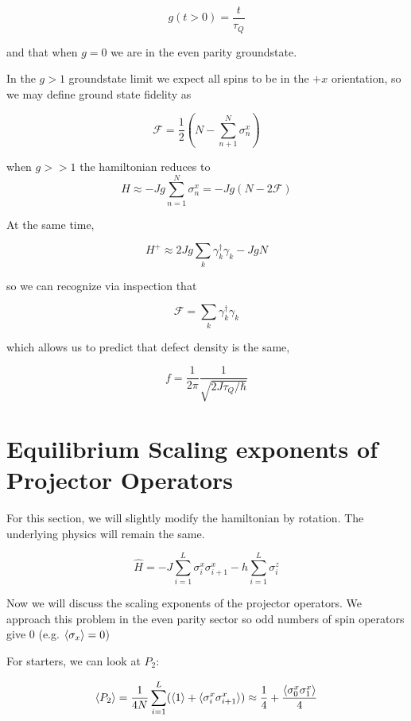 \documentclass{article}
\begin{document}
$$g(t>0) = \frac{t}{\tau_Q}$$ 

and that when $g=0$ we are in the even parity groundstate.

In the $g>1$ groundstate limit we expect all spins to be in the $+x$ orientation, so we may define ground state fidelity as 

\begin{equation}
    \mathcal{F} = \frac{1}{2}(N - \sum _{n+1}^{N} \sigma^x_n)
\end{equation}

when $g>>1$ the hamiltonian reduces to $$H \approx -Jg \sum^N_{n=1} \sigma^x_n = -Jg(N-2\mathcal{F})$$

At the same time, 

$$H^{+} \approx 2Jg\sum_k \gamma^\dagger_k \gamma_k - JgN$$

so we can recognize via inspection that 

$$\mathcal{F} = \sum_k \gamma_k^\dagger \gamma_k$$

which allows us to predict that defect density is the same, 

\begin{equation}
    f = \frac{1}{2\pi} \frac{1}{\sqrt{2 J \tau_Q /\hbar}}
\end{equation}

\section{Equilibrium Scaling exponents of Projector Operators}

For this section, we will slightly modify the hamiltonian by rotation. The underlying physics will remain the same.

\begin{equation}
    \hat{H} = -J \sum_{i=1}^{L} \sigma^{x}_{i} \sigma^{x}_{i+1} -h \sum_{i=1}^{L} \sigma^{z}_{i}
\end{equation}

Now we will discuss the scaling exponents of the projector operators. We approach this problem in the even parity sector so odd numbers of spin operators give 0 (e.g. $\braket{\sigma_x}=0$)

For starters, we can look at $P_2$:

\begin{equation}
    \braket{P_2} = \frac{1}{4N} \sum_{i=1}^{L} (\braket{1} + \braket{\sigma^x_i \sigma^{x}_{i+1}}) \approx \frac{1}{4}+\frac{ 
        \braket{{\sigma^x_0 \sigma^{x}_{1}}}}{4}
\end{equation}
\end{document}
